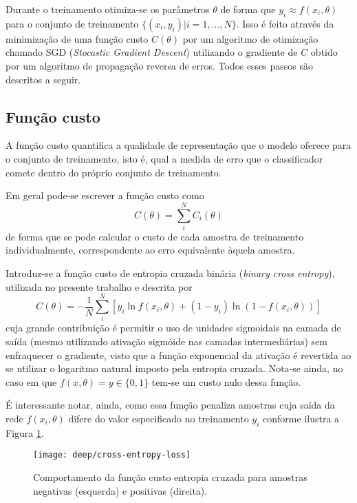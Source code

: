 Durante o treinamento otimiza-se os parâmetros $\theta$ de forma que $y_i \approx f(x_i, \theta)$ para o conjunto de treinamento $\{ (x_i, y_i) | i=1,\dots,N \}$. Isso é feito através da minimização de uma função custo $C(\theta)$ por um algoritmo de otimização chamado SGD (\textit{Stocastic Gradient Descent}) utilizando o gradiente de $C$ obtido por um algoritmo de propagação reversa de erros. Todos esses passos são descritos a seguir.

\subsection{Função custo}
A função custo quantifica a qualidade de representação que o modelo oferece para o conjunto de treinamento, isto é, qual a medida de erro que o classificador comete dentro do próprio conjunto de treinamento.

Em geral pode-se escrever a função custo como
\begin{equation}
C(\theta) = \sum_i^N C_i(\theta)
\end{equation}
de forma que se pode calcular o custo de cada amostra de treinamento individualmente, correspondente ao erro equivalente àquela amostra.

Introduz-se a função custo de entropia cruzada binária (\textit{binary cross entropy}), utilizada no presente trabalho e descrita por
\begin{equation}
\label{eq:bcr}
C(\theta) = -\frac{1}{N} \sum_i^N \left[y_i \ln f(x_i,\theta) + (1-y_i) \ln (1-f(x_i,\theta))\right]
\end{equation}
cuja grande contribuição é permitir o uso de unidades sigmoidais na camada de saída (mesmo utilizando ativação sigmóide nas camadas intermediárias) sem enfraquecer o gradiente, visto que a função exponencial da ativação é revertida ao se utilizar o logaritmo natural imposto pela entropia cruzada. Nota-se ainda, no caso em que $f(x,\theta)=y \in \{0, 1\}$ tem-se um custo nulo dessa função.

É interessante notar, ainda, como essa função penaliza amostras cuja saída da rede $f(x_i,\theta)$ difere do valor especificado no treinamento $y_i$ conforme ilustra a Figura \ref{fig:plot-cost}.

\begin{figure}
\centering
\texttt{[image: deep/cross-entropy-loss]}
\caption{Comportamento da função custo entropia cruzada para amostras negativas (esquerda) e positivas (direita).}
\label{fig:plot-cost}
\end{figure}

